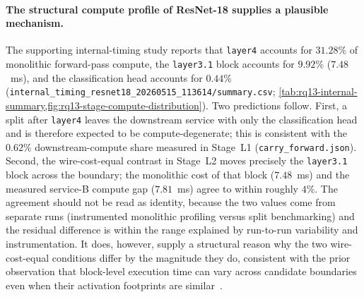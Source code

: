 \paragraph{The structural compute profile of ResNet-18 supplies a plausible mechanism.}
The supporting internal-timing study reports that \texttt{layer4}
accounts for \(31.28\%\) of monolithic forward-pass compute, the
\texttt{layer3.1} block accounts for \(9.92\%\) (\(7.48\)~ms), and
the classification head accounts for \(0.44\%\)
(\texttt{internal\_timing\_resnet18\_20260515\_113614/summary.csv};
\cref{tab:rq13-internal-summary,fig:rq13-stage-compute-distribution}).
Two predictions follow. First, a split after \texttt{layer4} leaves
the downstream service with only the classification head and is
therefore expected to be compute-degenerate; this is consistent with
the \(0.62\%\) downstream-compute share measured in Stage~L1
(\texttt{carry\_forward.json}). Second, the wire-cost-equal contrast
in Stage~L2 moves precisely the \texttt{layer3.1} block across the
boundary; the monolithic cost of that block (\(7.48\)~ms) and the
measured service-B compute gap (\(7.81\)~ms) agree to within roughly
\(4\%\). The agreement should not be read as identity, because the
two values come from separate runs (instrumented monolithic profiling
versus split benchmarking) and the residual difference is within the
range explained by run-to-run variability and instrumentation. It
does, however, supply a structural reason why the two wire-cost-equal
conditions differ by the magnitude they do, consistent with the prior
observation that block-level execution time can vary across candidate
boundaries even when their activation footprints are
similar~\cite{pareto_split}.

